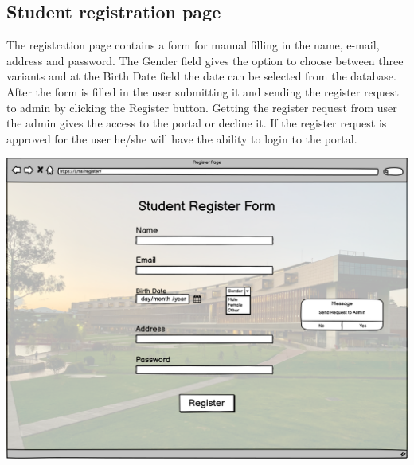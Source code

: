 \subsection{Student registration page}
  
The registration page contains a form for manual filling in the name, e-mail, address and password. The Gender field gives the option to choose between three variants and at the Birth Date field the date can be selected from the database. After the form is filled in the user submitting it and sending the register request to admin by clicking the Register button. Getting the register request from user the admin gives the access to the portal or decline it. If the register request is approved for the user he/she will have the ability to login to the portal.  

\includegraphics[width=\columnwidth]{images/StudentRegisterForm.png}